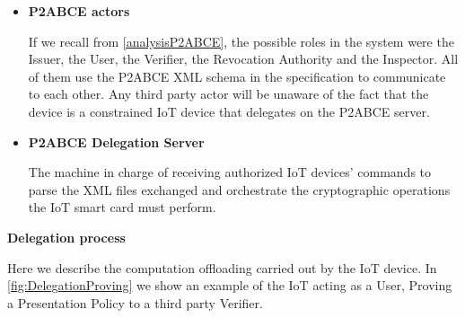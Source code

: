 \documentclass[journal]{IEEEtran}
\begin{document}
\begin{itemize}
	
	\item \textbf{P2ABCE actors}
	
	If we recall from \autoref{analysisP2ABCE}, the possible roles in the system were the Issuer, the User, the Verifier, the Revocation Authority and the Inspector. All of them use the P2ABCE XML schema in the specification to communicate to each other. Any third party actor will be unaware of the fact that the device is a constrained IoT device that delegates on the P2ABCE server.
	
	
	
	\item \textbf{P2ABCE Delegation Server}
	
	The machine in charge of receiving authorized IoT devices' commands to parse the XML files exchanged and orchestrate the cryptographic operations the IoT smart card must perform.
	
	
\end{itemize}

\hfil

\begin{flushleft}
	\textbf{Delegation process}
\end{flushleft}

Here we describe the computation offloading carried out by the IoT device.  In \autoref{fig:DelegationProving} we show an example of the IoT acting as a User, Proving a Presentation Policy to a third party Verifier.
\end{document}
